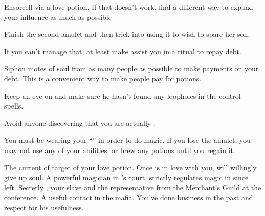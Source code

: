 \documentclass[char]{NeptuneBall}
\begin{document}
\begin{itemz}[Goals]
  \item Ensorcell \cKing{\King} \cKing{} via a love potion. If that doesn't work, find a different way to expand your influence as much as possible
  \item Finish the second amulet and then trick \cAriel{} into using it to wish to spare her son.
  \item If you can't manage that, at least make \cAriel{} assist you in a \gRitual{} ritual to repay \cAriel{\their} debt.
  \item Siphon motes of soul from as many people as possible to make payments on your debt. This is a convenient way to make people pay for potions.
  \item Keep an eye on \cSlave{} and make sure he hasn't found any loopholes in the control spells.
  \item Avoid anyone discovering that you are actually \cWitch{}.
\end{itemz}

\begin{itemz}[Notes]
  \item You must be wearing your ``\iAmulet{}'' in order to do magic. If you lose the amulet, you may not use any of your abilities, or brew any potions until you regain it.
\end{itemz}

\begin{contacts}
  \contact{\cKing{}} The current \cKing{\King} of \pAtlantis{} target of your love potion. Once \cKing{\they} is in love with you, \cKing{\they} will willingly give up \cKing{\them} soul.
  \contact{\cManta{}} A powerful magician in \cKing{}'s court. \cManta{\They} strictly regulates magic in \pAtlantis{} since \cAriel{} left.
  \contact{\cSlave{\MYname}} Secretly \cSlave{}, your slave and the representative from the Merchant's Guild at the conference.
  \contact{\cPriest{}} A useful contact in the mafia. You've done business in the past and respect \cPriest{\them} for his usefulness.
\end{contacts}
\end{document}
